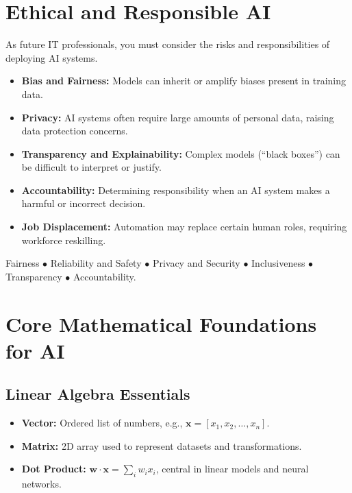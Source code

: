 \documentclass[11pt,a4paper]{article}
\begin{document}
\section{Ethical and Responsible AI}

\begin{alertbox}
As future IT professionals, you must consider the risks and responsibilities of deploying AI systems.
\end{alertbox}

\begin{itemize}[leftmargin=*]
  \item \textbf{Bias and Fairness:} Models can inherit or amplify biases present in training data.
  \item \textbf{Privacy:} AI systems often require large amounts of personal data, raising data protection concerns.
  \item \textbf{Transparency and Explainability:} Complex models (``black boxes'') can be difficult to interpret or justify.
  \item \textbf{Accountability:} Determining responsibility when an AI system makes a harmful or incorrect decision.
  \item \textbf{Job Displacement:} Automation may replace certain human roles, requiring workforce reskilling.
\end{itemize}

\begin{conceptbox}
Fairness $\bullet$ Reliability and Safety $\bullet$ Privacy and Security $\bullet$ Inclusiveness $\bullet$ Transparency $\bullet$ Accountability.
\end{conceptbox}

\section{Core Mathematical Foundations for AI}

\subsection{Linear Algebra Essentials}
\begin{itemize}[leftmargin=*]
  \item \textbf{Vector:} Ordered list of numbers, e.g., $\mathbf{x}=[x_1,x_2,\dots,x_n]$.
  \item \textbf{Matrix:} 2D array used to represent datasets and transformations.
  \item \textbf{Dot Product:} $\mathbf{w}\cdot\mathbf{x}=\sum_i w_i x_i$, central in linear models and neural networks.
\end{itemize}
\end{document}
